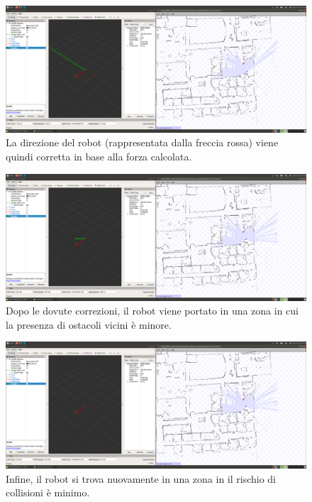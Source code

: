 \documentclass[Lau, binding=0.6cm, oneside]{sapthesis}
\begin{document}
\begin{figure}[htp]
    \centering
    \includegraphics[width=13.5cm]{rviz_force3.png}
    \caption{La direzione del robot (rappresentata dalla freccia rossa) viene quindi corretta in base alla forza calcolata.}
    \label{fig:rviz_force3}
\end{figure}
\begin{figure}[htp]
    \centering
    \includegraphics[width=13.5cm]{rviz_force4.png}
    \caption{Dopo le dovute correzioni, il robot viene portato in una zona in cui la presenza di ostacoli vicini è minore.}
    \label{fig:rviz_force4}
\end{figure}
\begin{figure}[htp]
    \centering
    \includegraphics[width=13.5cm]{rviz_force5.png}
    \caption{Infine, il robot si trova nuovamente in una zona in il rischio di collisioni è minimo.}
    \label{fig:rviz_force5}
\end{figure}
\end{document}
